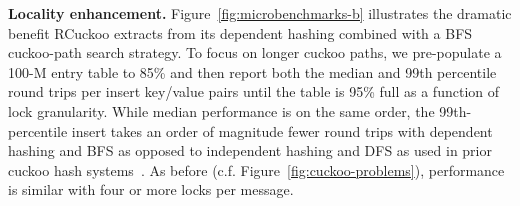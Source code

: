 
\textbf{Locality enhancement.}
Figure~\ref{fig:microbenchmarks-b} illustrates the dramatic benefit
RCuckoo extracts from its dependent hashing combined with a BFS
cuckoo-path search strategy.  To focus on longer cuckoo paths, we
pre-populate a 100-M entry table to 85\% and then report both the median
and 99th percentile round trips per insert 
key/value pairs until the table is 95\% full as a function of lock
granularity.  While median performance is on the same order, the
99th-percentile insert takes an order of magnitude fewer round trips
with dependent hashing and BFS as opposed to independent hashing and
DFS as used in prior cuckoo hash
systems~\cite{cuckoo-improvements,pilaf,cuckoo}.  As before
(c.f. Figure~\ref{fig:cuckoo-problems}), performance is similar with
four or more locks per message.





